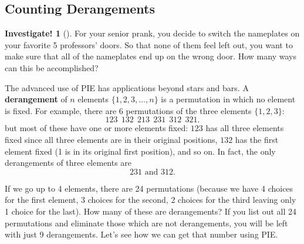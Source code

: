 \documentclass[10pt,]{book}
\newcommand{\terminology}[1]{\textbf{#1}}
\theoremstyle{plain}
\theoremstyle{definition}
\theoremstyle{definition}
\theoremstyle{definition}
\newtheorem{investigation}[project]{Investigate!}
\theoremstyle{definition}
\numberwithin{equation}{chapter}
\begin{document}
\subsection[{Counting Derangements}]{Counting Derangements}\label{subsec_derangements}
\begin{investigation}[]\label{investigation-8}
\hypertarget{p-974}{}%
For your senior prank, you decide to switch the nameplates on your favorite 5 professors' doors. So that none of them feel left out, you want to make sure that all of the nameplates end up on the wrong door. How many ways can this be accomplished?%
\end{investigation}
\hypertarget{p-975}{}%
The advanced use of PIE has applications beyond stars and bars. A \terminology{derangement} of \(n\) elements \(\{1,2,3,\ldots, n\}\) is a permutation in which no element is fixed. For example, there are \(6\) permutations of the three elements \(\{1,2,3\}\):%
\begin{equation*}
123 ~~ 132 ~~ 213 ~~ 231 ~~ 312 ~~ 321.
\end{equation*}
but most of these have one or more elements fixed: \(123\) has all three elements fixed since all three elements are in their original positions, \(132\) has the first element fixed (1 is in its original first position), and so on. In fact, the only derangements of three elements are%
\begin{equation*}
231 \text{ and } 312.
\end{equation*}
%
\par
\hypertarget{p-976}{}%
If we go up to 4 elements, there are 24 permutations (because we have 4 choices for the first element, 3 choices for the second, 2 choices for the third leaving only 1 choice for the last). How many of these are derangements? If you list out all 24 permutations and eliminate those which are not derangements, you will be left with just 9 derangements. Let's see how we can get that number using PIE.%
\end{document}
